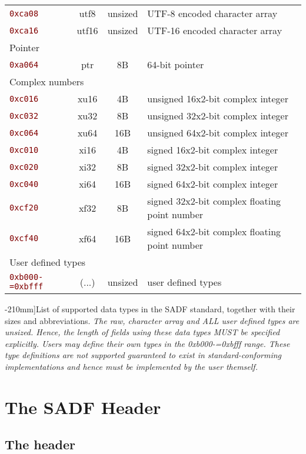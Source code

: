 \documentclass[pagesize=a4]{tufte-book}
\newcommand{\hlred}[1]{\textcolor{Maroon}{#1}}%
\newcommand{\hex}[1]{\hlred{\texttt{#1}}}%
\begin{document}
\begin{table*}[ht]
\begin{tabular}{lccl}
		\quad \hex{0xca08} & utf8 & unsized & UTF-8 encoded character array\\
		\quad \hex{0xca16} & utf16 & unsized & UTF-16 encoded character array\\
		\multicolumn{4}{l}{Pointer}\\
		\quad \hex{0xa064} & ptr & 8B & 64-bit pointer\\
		\multicolumn{4}{l}{Complex numbers}\\
		\quad \hex{0xc016} & xu16 & 4B & unsigned 16x2-bit complex integer\\
		\quad \hex{0xc032} & xu32 & 8B & unsigned 32x2-bit complex integer\\
		\quad \hex{0xc064} & xu64 & 16B & unsigned 64x2-bit complex integer\\
		\quad \hex{0xc010} & xi16 & 4B & signed 16x2-bit complex integer\\
		\quad \hex{0xc020} & xi32 & 8B & signed 32x2-bit complex integer\\
		\quad \hex{0xc040} & xi64 & 16B & signed 64x2-bit complex integer\\
		\quad \hex{0xcf20} & xf32 & 8B & signed 32x2-bit complex floating point number\\
		\quad \hex{0xcf40} & xf64 & 16B & signed 64x2-bit complex floating point number\\
		\multicolumn{4}{l}{User defined types}\\
		\quad \hex{0xb000-=0xbfff} & (...) & unsized & user defined types\\
		\bottomrule
	\end{tabular}
	\label{tab:data_type_codes}
	\caption[List of supported data types in the SADF standard, together with
	their sizes and abbreviations.][-210mm]{List of supported data types in the SADF standard, together with their sizes and abbreviations.\emph{ The raw, character array and ALL user defined types are unsized. Hence, the length of fields using these data types MUST be specified explicitly. Users may define their own types in the 0xb000-=0xbfff range. These type definitions are not supported guaranteed to exist in standard-conforming implementations and hence must be implemented by the user themself.}}
\end{table*}

\chapter{The SADF Header}

\section{The header}
\end{document}
